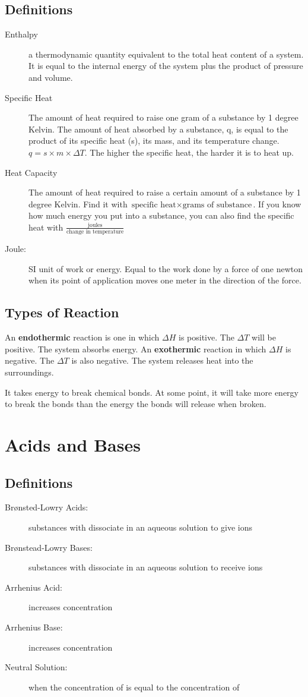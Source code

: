 \documentclass[]{article}
\begin{document}
\subsection{Definitions}
\begin{description}
\item[Enthalpy] a thermodynamic quantity equivalent to the total heat content of a system. It is equal to the internal energy of the system plus the product of pressure and volume.

\item[Specific Heat] The amount of heat required to raise one gram of a substance by 1 degree Kelvin. 
The amount of heat absorbed by a substance, q, is equal to the product of its specific heat (s), its mass, and its temperature change. $ q = s \times m \times \Delta T $. The higher the specific heat, the harder it is to heat up.
\item[Heat Capacity] The amount of heat required to raise a certain amount of a substance by 1 degree Kelvin. Find it with $ \text{specific heat} \times \text{grams of substance} $. If you know how much energy you put into a substance, you can also find the specific heat with $ \frac{\text{joules}}{\text{change in temperature}} $
\item[Joule:] SI unit of work or energy. Equal to the work done by a force of one newton when its point of application moves one meter in the direction of the force.
\end{description}
\subsection{Types of Reaction}
An \textbf{endothermic} reaction is one in which $ \Delta H $ is positive. The $ \Delta T $ will be positive. The system absorbs energy. An \textbf{exothermic} reaction in which $ \Delta H $ is negative. The $ \Delta T $ is also negative. The system releases heat into the surroundings.

It takes energy to break chemical bonds. At some point, it will take more energy to break the bonds than the energy the bonds will release when broken. 
\section{Acids and Bases}
\subsection{Definitions}
\begin{description}
\item[Br\o nsted-Lowry Acids:] substances with dissociate in an aqueous solution to give  ions
\item[Br\o nstead-Lowry Bases:] substances with dissociate in an aqueous solution to receive  ions
\item[Arrhenius Acid:] increases  concentration
\item[Arrhenius Base:] increases  concentration
\item[Neutral Solution:] when the concentration of  is equal to the concentration of 
\end{description}
\end{document}
